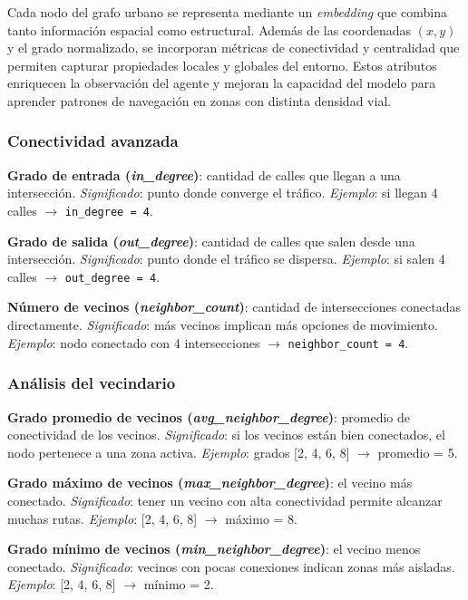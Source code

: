 \documentclass[11pt,a4paper]{article}
\begin{document}
Cada nodo del grafo urbano se representa mediante un \textit{embedding} que combina tanto información espacial como estructural. Además de las coordenadas $(x, y)$ y el grado normalizado, se incorporan métricas de conectividad y centralidad que permiten capturar propiedades locales y globales del entorno. Estos atributos enriquecen la observación del agente y mejoran la capacidad del modelo para aprender patrones de navegación en zonas con distinta densidad vial.

\subsubsection{Conectividad avanzada}

\textbf{Grado de entrada (\textit{in\_degree})}: cantidad de calles que llegan a una intersección.  
\textit{Significado}: punto donde converge el tráfico.  
\textit{Ejemplo}: si llegan 4 calles $\rightarrow$ \texttt{in\_degree = 4}.

\textbf{Grado de salida (\textit{out\_degree})}: cantidad de calles que salen desde una intersección.  
\textit{Significado}: punto donde el tráfico se dispersa.  
\textit{Ejemplo}: si salen 4 calles $\rightarrow$ \texttt{out\_degree = 4}.

\textbf{Número de vecinos (\textit{neighbor\_count})}: cantidad de intersecciones conectadas directamente.  
\textit{Significado}: más vecinos implican más opciones de movimiento.  
\textit{Ejemplo}: nodo conectado con 4 intersecciones $\rightarrow$ \texttt{neighbor\_count = 4}.

\subsubsection{Análisis del vecindario}

\textbf{Grado promedio de vecinos (\textit{avg\_neighbor\_degree})}: promedio de conectividad de los vecinos.  
\textit{Significado}: si los vecinos están bien conectados, el nodo pertenece a una zona activa.  
\textit{Ejemplo}: grados [2, 4, 6, 8] $\rightarrow$ promedio = 5.

\textbf{Grado máximo de vecinos (\textit{max\_neighbor\_degree})}: el vecino más conectado.  
\textit{Significado}: tener un vecino con alta conectividad permite alcanzar muchas rutas.  
\textit{Ejemplo}: [2, 4, 6, 8] $\rightarrow$ máximo = 8.

\textbf{Grado mínimo de vecinos (\textit{min\_neighbor\_degree})}: el vecino menos conectado.  
\textit{Significado}: vecinos con pocas conexiones indican zonas más aisladas.  
\textit{Ejemplo}: [2, 4, 6, 8] $\rightarrow$ mínimo = 2.
\end{document}
